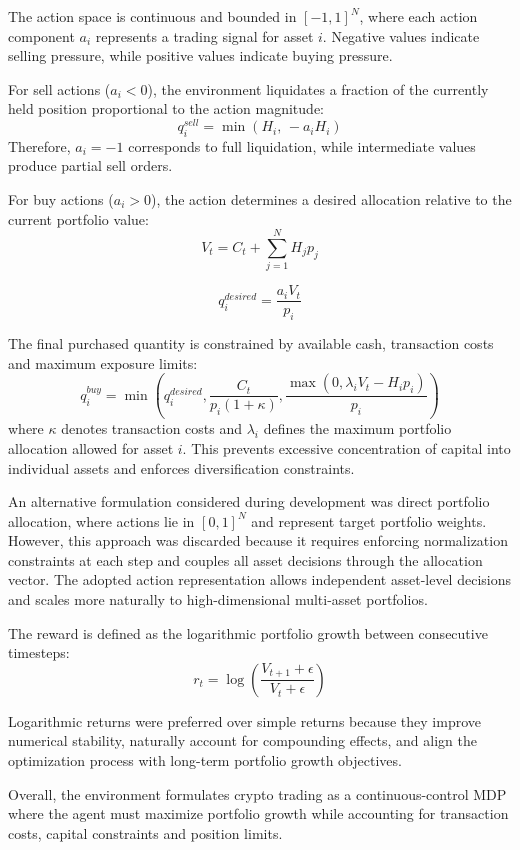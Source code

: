 The action space is continuous and bounded in $[-1,1]^N$, where each action component 
$a_i$ represents a trading signal for asset $i$. Negative values indicate selling 
pressure, while positive values indicate buying pressure.

For sell actions ($a_i < 0$), the environment liquidates a fraction of the currently 
held position proportional to the action magnitude:
\[
q_i^{sell} = \min(H_i,\,-a_iH_i)
\]
Therefore, $a_i=-1$ corresponds to full liquidation, while intermediate values produce 
partial sell orders.

For buy actions ($a_i > 0$), the action determines a desired allocation relative to the 
current portfolio value:
\[
V_t = C_t + \sum_{j=1}^{N} H_j p_j
\]

\[
q_i^{desired} = \frac{a_iV_t}{p_i}
\]

The final purchased quantity is constrained by available cash, transaction costs and 
maximum exposure limits:
\[
q_i^{buy} =
\min \left(
q_i^{desired},
\frac{C_t}{p_i(1+\kappa)},
\frac{\max(0,\lambda_iV_t-H_ip_i)}{p_i}
\right)
\]
where $\kappa$ denotes transaction costs and $\lambda_i$ defines the maximum portfolio 
allocation allowed for asset $i$. This prevents excessive concentration of capital 
into individual assets and enforces diversification constraints.

An alternative formulation considered during development was direct portfolio allocation, 
where actions lie in $[0,1]^N$ and represent target portfolio weights. However, this 
approach was discarded because it requires enforcing normalization constraints at each 
step and couples all asset decisions through the allocation vector. The adopted action 
representation allows independent asset-level decisions and scales more naturally to 
high-dimensional multi-asset portfolios.

The reward is defined as the logarithmic portfolio growth between consecutive timesteps:
\[
r_t =
\log\left(
\frac{V_{t+1}+\epsilon}
{V_t+\epsilon}
\right)
\]

Logarithmic returns were preferred over simple returns because they improve numerical 
stability, naturally account for compounding effects, and align the optimization process 
with long-term portfolio growth objectives.

Overall, the environment formulates crypto trading as a continuous-control MDP where the 
agent must maximize portfolio growth while accounting for transaction costs, capital 
constraints and position limits.

